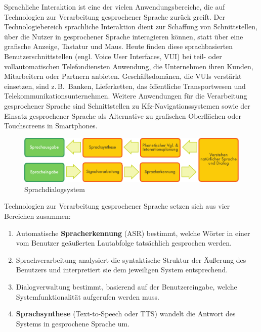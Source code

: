 \documentclass[]{../../metanetpaper}
\begin{document}
\begin{multicols}{2}
Sprachliche Interaktion ist eine der vielen Anwendungsbereiche, die auf Technologien zur Verarbeitung gesprochener Sprache zurück greift. Der Technologiebereich sprachliche Interaktion dient zur Schaffung von Schnittstellen, über die Nutzer in gesprochener Sprache interagieren können, statt über eine grafische Anzeige, Tastatur und Maus. Heute finden diese sprachbasierten Benutzerschnittstellen (engl. Voice User Interfaces, VUI) bei teil- oder vollautomatischen Telefondiensten Anwendung, die Unternehmen ihren Kunden, Mitarbeitern oder Partnern anbieten. Geschäftsdomänen, die VUIs verstärkt einsetzen, sind z.\,B.~Banken, Lieferketten, das öffentliche Transportwesen und Telekommunikationsunternehmen. Weitere Anwendungen für die Verarbeitung gesprochener Sprache sind Schnittstellen zu Kfz-Navigationssystemen sowie der Einsatz gesprochener Sprache als Alternative zu grafischen Oberflächen oder Touchscreens in Smartphones.


\begin{figure}[htb]
  \vspace{-9mm}
  \center  \includegraphics[width=\textwidth]{../_media/german/simple_speech-based_dialogue_architecture}
  \center
  \caption{Sprachdialogsystem}
  \label{fig:dialoguearch_de}
\end{figure}

Technologien zur Verarbeitung gesprochener Sprache setzen sich aus vier Bereichen zusammen:

\begin{enumerate}
\item Automatische \textbf{Spracherkennung} (ASR) bestimmt, welche Wörter in einer vom Benutzer geäußerten Lautabfolge tatsächlich gesprochen werden.
\item Sprachverarbeitung analysiert die syntaktische Struktur der Äußerung des Benutzers und interpretiert sie dem jeweiligen System entsprechend.
\item Dialogverwaltung bestimmt, basierend auf der Benutzereingabe, welche Systemfunktionalität aufgerufen werden muss.    
\item \textbf{Sprachsynthese} (Text-to-Speech oder TTS) wandelt die Antwort des Systems in gesprochene Sprache um.
\end{enumerate}


\end{multicols}
\end{document}
